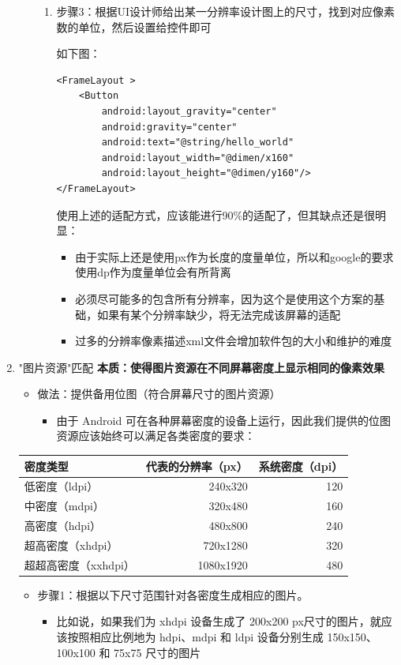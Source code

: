 \documentclass[9pt, b5paper]{article}
\begin{document}
\begin{enumerate}
\begin{enumerate}
\begin{enumerate}
\item 步骤3：根据UI设计师给出某一分辨率设计图上的尺寸，找到对应像素数的单位，然后设置给控件即可
\label{sec-1-6-2-1-2-3}

如下图：
\begin{verbatim}
<FrameLayout >
    <Button
        android:layout_gravity="center"
        android:gravity="center"
        android:text="@string/hello_world"
        android:layout_width="@dimen/x160"
        android:layout_height="@dimen/y160"/>
</FrameLayout>
\end{verbatim}

使用上述的适配方式，应该能进行90\%的适配了，但其缺点还是很明显：
\begin{itemize}
\item 由于实际上还是使用px作为长度的度量单位，所以和google的要求使用dp作为度量单位会有所背离
\item 必须尽可能多的包含所有分辨率，因为这个是使用这个方案的基础，如果有某个分辨率缺少，将无法完成该屏幕的适配
\item 过多的分辨率像素描述xml文件会增加软件包的大小和维护的难度
\end{itemize}
\end{enumerate}
\end{enumerate}

\item "图片资源"匹配
\label{sec-1-6-2-2}
\textbf{本质：使得图片资源在不同屏幕密度上显示相同的像素效果}

\begin{itemize}
\item 做法：提供备用位图（符合屏幕尺寸的图片资源）
\begin{itemize}
\item 由于 Android 可在各种屏幕密度的设备上运行，因此我们提供的位图资源应该始终可以满足各类密度的要求：
\end{itemize}
\end{itemize}
\begin{center}
\begin{tabular}{lrr}
\hline
密度类型 & 代表的分辨率（px） & 系统密度（dpi）\\
\hline
低密度（ldpi） & 240x320 & 120\\
中密度（mdpi） & 320x480 & 160\\
高密度（hdpi） & 480x800 & 240\\
超高密度（xhdpi） & 720x1280 & 320\\
超超高密度（xxhdpi） & 1080x1920 & 480\\
\hline
\end{tabular}
\end{center}
\begin{itemize}
\item 步骤1：根据以下尺寸范围针对各密度生成相应的图片。
\begin{itemize}
\item 比如说，如果我们为 xhdpi 设备生成了 200x200 px尺寸的图片，就应该按照相应比例地为 hdpi、mdpi 和 ldpi 设备分别生成 150x150、100x100 和 75x75 尺寸的图片
\end{itemize}
\end{itemize}


\end{enumerate}
\end{document}
